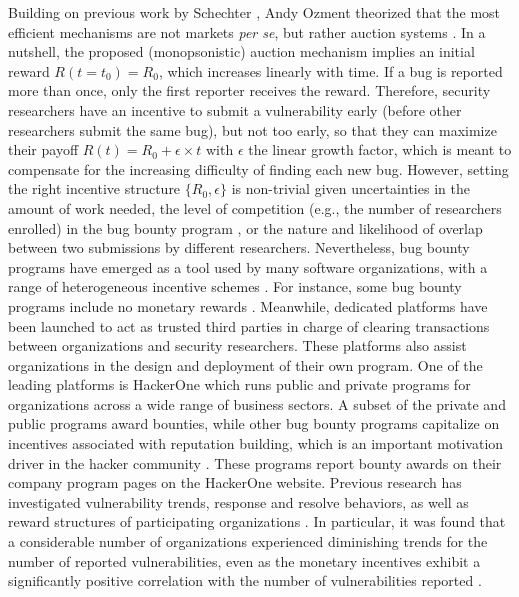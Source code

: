 Building on previous work by Schechter \cite{schechter2002buy}, Andy Ozment \cite{ozment2004bug} theorized that the most efficient mechanisms are not markets {\it per se}, but rather auction systems \cite{milgrom1982theory}. In a nutshell, the proposed (monopsonistic) auction mechanism implies an initial reward $R(t=t_0) = R_0$, which increases linearly with time. If a bug is reported more than once, only the first reporter receives the reward. Therefore, security researchers have an incentive to submit a vulnerability early (before other researchers submit the same bug), but not too early, so that they can maximize their payoff $R(t) = R_0 + \epsilon \times t$ with $\epsilon$ the linear growth factor, which is meant to compensate for the increasing difficulty of finding each new bug. However, setting the right incentive structure $\{R_0,\epsilon \}$ is non-trivial given uncertainties in the amount of work needed, the level of competition (e.g., the number of researchers enrolled) in the bug bounty program \cite{pandey2014assessment}, or the nature and likelihood of overlap between two submissions by different researchers. Nevertheless, bug bounty programs have emerged as a tool used by many software organizations, with a range of heterogeneous incentive schemes \cite{finifter2013empirical}. For instance, some bug bounty programs include no monetary rewards \cite{zhao2014exploratory}. Meanwhile, dedicated platforms have been launched to act as trusted third parties in charge of clearing transactions between organizations and security researchers. These platforms also assist organizations in the design and deployment of their own program. One of the leading platforms is HackerOne which runs public and private programs for organizations across a wide range of business sectors. A subset of the private and public programs award bounties, while other bug bounty programs capitalize on incentives associated with reputation building, which is an important motivation driver in the hacker community \cite{lakhani2005htu}. These programs report bounty awards on their company program pages on the HackerOne website. Previous research has investigated vulnerability trends, response and resolve behaviors, as well as reward structures of participating organizations \cite{zhao2014exploratory,zhao2015empirical}. In particular, it was found that a considerable number of organizations experienced diminishing trends for the number of reported vulnerabilities, even as the monetary incentives exhibit a significantly positive correlation with the number of vulnerabilities reported \cite{zhao2015empirical}.

